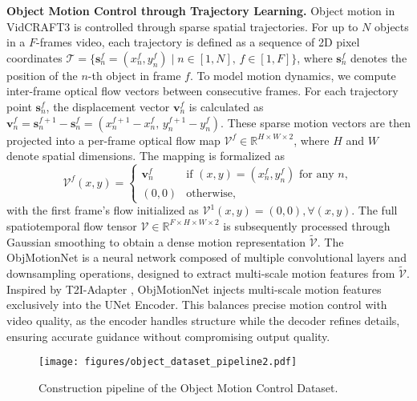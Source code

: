 \noindent \textbf{Object Motion Control through Trajectory Learning.}
Object motion in VidCRAFT3 is controlled through sparse spatial trajectories. For up to $N$ objects in a $F$-frames video, each trajectory is defined as a sequence of 2D pixel coordinates $\mathcal{T} = \{\mathbf{s}_n^f = (x_n^f, y_n^f) \mid n \in [1, N],\, f \in [1, F]\}$, 
where $\mathbf{s}_n^f$ denotes the position of the $n$-th object in frame $f$. To model motion dynamics, we compute inter-frame optical flow vectors between consecutive frames. For each trajectory point $\mathbf{s}_n^f$, the displacement vector $\mathbf{v}_n^f$ is calculated as $\mathbf{v}_n^f = \mathbf{s}_n^{f+1} - \mathbf{s}_n^f = (x_n^{f+1} - x_n^f, \, y_n^{f+1} - y_n^f).$
These sparse motion vectors are then projected into a per-frame optical flow map $\mathcal{V}^f \in \mathbb{R}^{H \times W \times 2}$, where $H$ and $W$ denote spatial dimensions. The mapping is formalized as 
\begin{equation}
\mathcal{V}^f(x, y) = 
\begin{cases} 
\mathbf{v}_n^f & \text{if } (x, y) = (x_n^{f}, y_n^{f}) \text{ for any } n, \\ 
(0, 0) & \text{otherwise},
\end{cases}
\end{equation}
with the first frame's flow initialized as $\mathcal{V}^1(x, y) = (0, 0), \forall (x, y)$. The full spatiotemporal flow tensor $\mathcal{V} \in \mathbb{R}^{F \times H \times W \times 2}$ is subsequently processed through Gaussian smoothing to obtain a dense motion representation $\tilde{\mathcal{V}}$.
The ObjMotionNet is a neural network composed of multiple convolutional layers and downsampling operations, designed to extract multi-scale motion features from $\tilde{\mathcal{V}}$. 
Inspired by T2I-Adapter \cite{mou2024t2i}, ObjMotionNet injects multi-scale motion features exclusively into the UNet Encoder. This balances precise motion control with video quality, as the encoder handles structure while the decoder refines details, ensuring accurate guidance without compromising output quality.

\begin{figure}
    \centering
    \texttt{[image: figures/object\_dataset\_pipeline2.pdf]}
    \caption{Construction pipeline of the Object Motion Control Dataset.}
    \label{fig:object_dataset_pipeline}
    \vspace{-10pt}
\end{figure}

